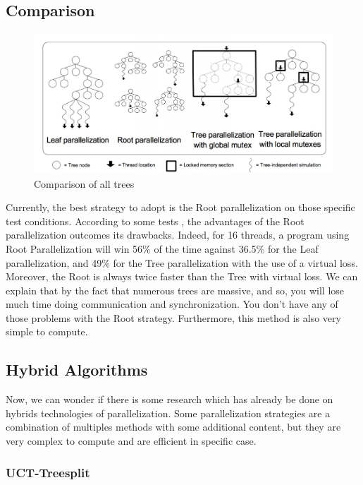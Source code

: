 \subsection{Comparison}
\begin{figure}[!h] 
\centerline{\includegraphics[scale=0.60]{2_State_of_the_art/Strategy_of_root_parallelization_Mikail/impara.png}}
   \caption{\label{étiquette} Comparison of all trees}
\label{comp_algo}
\end{figure}

Currently, the best strategy to adopt is the Root parallelization on those specific test conditions. According to some tests \cite{parallel_comp}\cite{tree_root_comp}, the advantages of the Root parallelization outcomes its drawbacks. Indeed, for 16 threads, a program using Root Parallelization will win 56\% of the time against 36.5\% for the Leaf parallelization, and 49\% for the Tree parallelization with the use of a virtual loss. Moreover, the Root is always twice faster than the Tree with virtual loss. We can explain that by the fact that numerous trees are massive, and so, you will lose much time doing communication and synchronization. You don’t have any of those problems with the Root strategy. Furthermore, this method is also very simple to compute.

\subsection{Hybrid Algorithms}

Now, we can wonder if there is some research which has already be done on hybrids technologies of parallelization. Some parallelization strategies are a combination of multiples methods with some additional content, but they are very complex to compute and are efficient in specific case.

\subsubsection{UCT-Treesplit}

